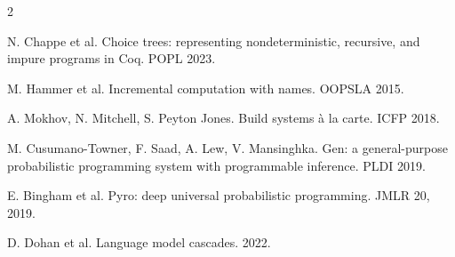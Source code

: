 \documentclass{article}
\begin{document}
\begin{multicols}{2}
{N. Chappe et al. Choice trees: representing nondeterministic, recursive, and impure programs in
Coq. POPL 2023.\par
M. Hammer et al. Incremental computation with names. OOPSLA 2015.\par
A. Mokhov, N. Mitchell, S. Peyton Jones. Build systems \`a la carte. ICFP 2018.\par
M. Cusumano-Towner, F. Saad, A. Lew, V. Mansinghka. Gen: a general-purpose probabilistic
programming system with programmable inference. PLDI 2019.\par
E. Bingham et al. Pyro: deep universal probabilistic programming. JMLR 20, 2019.\par
D. Dohan et al. Language model cascades. 2022.\par}
\end{multicols}
\end{document}
